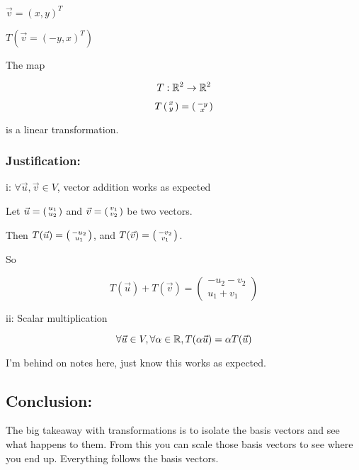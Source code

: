 \documentclass[a4paper]{article}
\begin{document}
$\vec{v} = (x, y)^T$

$T(\vec{v} = (-y, x)^T)$

The map

\[T: \mathbb{R}^2 \to \mathbb{R}^2\]

\[T \left(\begin{smallmatrix} x \\ y \end{smallmatrix} \right) = \left(\begin{smallmatrix} -y \\ x \end{smallmatrix} \right) \]

is a linear transformation.

\subsubsection{Justification:}

i: $\forall \vec{u}, \vec{v} \in V$, vector addition works as expected

Let $\vec{u} = \left(\begin{smallmatrix} u_1 \\ u_2 \end{smallmatrix} \right)$ and $\vec{v} = \left(\begin{smallmatrix} v_1 \\ v_2 \end{smallmatrix} \right)$ be two vectors.

Then $T(\vec{u}) = \left(\begin{smallmatrix} -u_2 \\ u_1 \end{smallmatrix} \right)$, and $T(\vec{v}) = \left(\begin{smallmatrix} -v_2 \\ v_1 \end{smallmatrix} \right)$. 

So 

\[T(\vec{u}) + T(\vec{v}) = 
\begin{pmatrix}
	-u_2 - v_2 \\
	u_1 + v_1
\end{pmatrix}
\]

ii: Scalar multiplication

\[\forall \vec{u} \in V, \forall \alpha \in \mathbb{R}, T(\alpha \vec{u}) = \alpha T(\vec{u})\]

I'm behind on notes here, just know this works as expected.

\subsection*{Conclusion:}

The big takeaway with transformations is to isolate the basis vectors and see what happens to them. From this you can scale those basis vectors to see where you end up. Everything follows the basis vectors.
\end{document}
